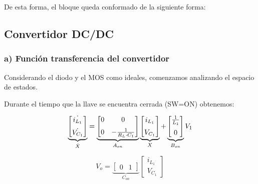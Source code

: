 \documentclass[e4_tp2_main.tex]{subfiles}
\begin{document}
De esta forma, el bloque queda conformado de la siguiente forma:

\begin{center}
\end{center}



\subsection{Convertidor DC/DC}
\subsubsection*{a) Funci\'on transferencia del convertidor}

Considerando el diodo y el MOS como ideales, comenzamos analizando el espacio de estados. 

Durante el tiempo que la llave se encuentra cerrada (SW=ON) obtenemos:

\begin{equation}
\underbrace{
\begin{bmatrix}
\dot{i_{L_1}} \vspace{0.2cm} \\
\dot{V_{C_1}} 
\end{bmatrix}
}_{\dot{X}}
=
\underbrace{
\begin{bmatrix}
{0} & {0} \vspace{0.2cm}\\
{0} & {-\frac{1}{R_L \cdot C_1}} 
\end{bmatrix}
}_{A_{on}}
\underbrace{
\begin{bmatrix}
{i_{L_1}} \vspace{0.2cm}\\
{V_{C_1}} 
\end{bmatrix}
}_{X}
+
\underbrace{
\begin{bmatrix}
{\frac{1}{L_1}} \vspace{0.2cm}\\
{0} 
\end{bmatrix}
}_{B_{on}}
V_1
\end{equation}


\begin{equation}
V_o =
\underbrace{
\begin{bmatrix}
{0} & {1} 
\end{bmatrix}
}_{C_{on}}
\begin{bmatrix}
{i_{L_1}} \\
{V_{C_1}} 
\end{bmatrix}
\end{equation}
\end{document}
